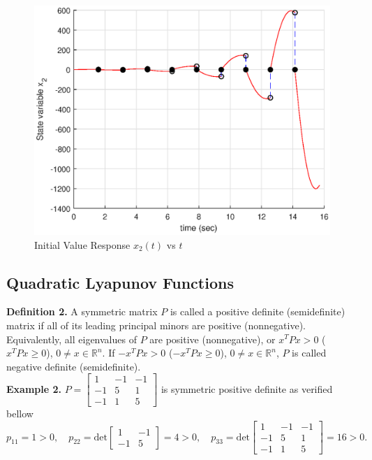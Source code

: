 \documentclass[11pt,a4paper]{article}
\begin{document}
\begin{figure}
\centering
\includegraphics[scale=0.8]{FG4.eps} 
\caption{Initial Value Response $x_2(t)$ vs $t$}
\end{figure}


%
\subsection{Quadratic Lyapunov Functions}
	\quad \text{ } \textbf{Definition 2.} A symmetric matrix $P$ is called a positive definite (semidefinite) matrix if all of its leading principal minors are positive (nonnegative). Equivalently, all eigenvalues of $P$ are positive (nonnegative), or
$x^TPx > 0$ ($x^TPx \geq 0$), $0 \neq x \in \mathbb{R}^n$. If
$-x^TPx > 0$ ($-x^TPx \geq 0$), $0 \neq x \in \mathbb{R}^n$, $P$
is called  negative definite (semidefinite).\\
	
	\textbf{Example 2.}
	$P =
	\begin{bmatrix}
 		 1 & -1 & -1 \\
 		-1 &  5 &  1 \\
 		-1 &  1 &  5
 	\end{bmatrix}$
is symmetric positive definite as verified bellow
$$
p_{11} = 1 > 0, \quad
p_{22}= \mathrm{det}
\begin{bmatrix}
 		 1 & -1 \\
 		-1 &  5
 	\end{bmatrix}
 	= 4 > 0, \quad
p_{33} = \mathrm{det}
	\begin{bmatrix}
 		 1 & -1 & -1 \\
 		-1 &  5 &  1 \\
 		-1 &  1 &  5
 	\end{bmatrix}
 	= 16 > 0.
$$
\end{document}
